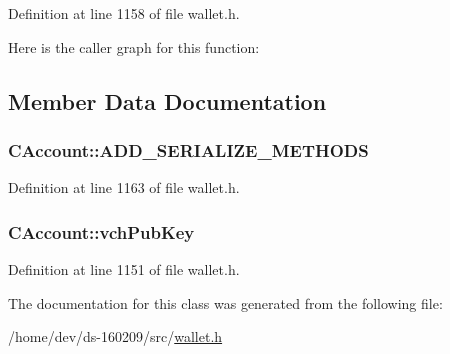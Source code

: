Definition at line 1158 of file wallet.\+h.



Here is the caller graph for this function\+:




\subsection{Member Data Documentation}
\hypertarget{class_c_account_ad1054a718063912b1c5e1103eaa005cc}{}
\subsubsection[{A\+D\+D\+\_\+\+S\+E\+R\+I\+A\+L\+I\+Z\+E\+\_\+\+M\+E\+T\+H\+O\+D\+S}]{\setlength{\rightskip}{0pt plus 5cm}C\+Account\+::\+A\+D\+D\+\_\+\+S\+E\+R\+I\+A\+L\+I\+Z\+E\+\_\+\+M\+E\+T\+H\+O\+D\+S}\label{class_c_account_ad1054a718063912b1c5e1103eaa005cc}


Definition at line 1163 of file wallet.\+h.

\hypertarget{class_c_account_a8bc9b476371009c12a6c25d4c7264de5}{}
\subsubsection[{vch\+Pub\+Key}]{ C\+Account\+::vch\+Pub\+Key}\label{class_c_account_a8bc9b476371009c12a6c25d4c7264de5}


Definition at line 1151 of file wallet.\+h.



The documentation for this class was generated from the following file\+:\begin{DoxyCompactItemize}
\item 
/home/dev/ds-\/160209/src/\hyperlink{wallet_8h}{wallet.\+h}\end{DoxyCompactItemize}
